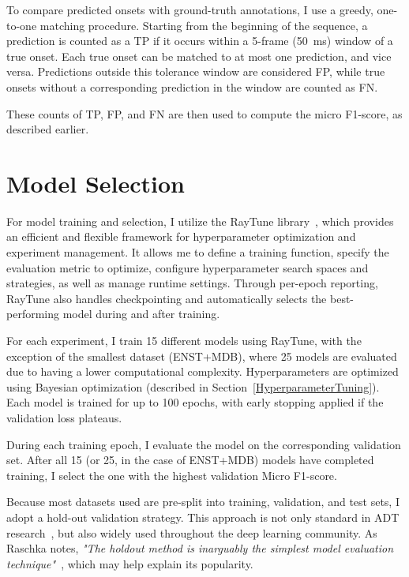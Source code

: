 To compare predicted onsets with ground-truth annotations, I use a greedy, one-to-one matching procedure. Starting from the beginning of the sequence, a prediction is counted as a \acrfull{TP} if it occurs within a 5-frame (50~ms) window of a true onset. Each true onset can be matched to at most one prediction, and vice versa. Predictions outside this tolerance window are considered \acrfull{FP}, while true onsets without a corresponding prediction in the window are counted as \acrfull{FN}.

These counts of \acrshort{TP}, \acrshort{FP}, and \acrshort{FN} are then used to compute the micro F1-score, as described earlier.

\section{Model Selection}

For model training and selection, I utilize the RayTune library~\cite{liaw2018tuneresearchplatformdistributed}, which provides an efficient and flexible framework for hyperparameter optimization and experiment management. It allows me to define a training function, specify the evaluation metric to optimize, configure hyperparameter search spaces and strategies, as well as manage runtime settings. Through per-epoch reporting, RayTune also handles checkpointing and automatically selects the best-performing model during and after training.

For each experiment, I train 15 different models using RayTune, with the exception of the smallest dataset (ENST+MDB), where 25 models are evaluated due to having a lower computational complexity. Hyperparameters are optimized using Bayesian optimization (described in Section~\ref{HyperparameterTuning}). Each model is trained for up to 100 epochs, with early stopping applied if the validation loss plateaus. 

During each training epoch, I evaluate the model on the corresponding validation set. After all 15 (or 25, in the case of ENST+MDB) models have completed training, I select the one with the highest validation Micro F1-score. 

Because most datasets used are pre-split into training, validation, and test sets, I adopt a hold-out validation strategy. This approach is not only standard in \gls{ADT} research~\cite{vogl2016recurrent, 8350302, chang2024yourmt3+}, but also widely used throughout the deep learning community. As Raschka notes, \textit{"The holdout method is inarguably the simplest model evaluation technique"}~\cite{raschka2020modelevaluationmodelselection}, which may help explain its popularity.

